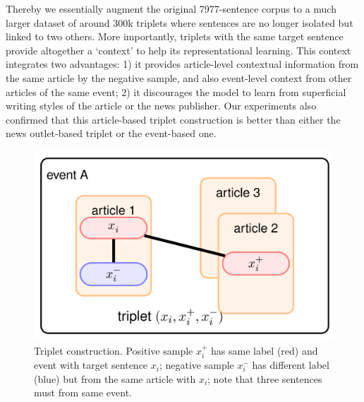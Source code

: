 Thereby we essentially augment the original 7977-sentence corpus to a much larger dataset of around 300k triplets where sentences are no longer isolated but linked to two others. More importantly, triplets with the same target sentence provide altogether a `context' to help its representational learning. This context integrates two advantages: 1) it provides article-level contextual information from the same article by the negative sample, and also event-level context from other articles of the same event; 2) it discourages the model to learn from superficial writing styles of the article or the news publisher. Our experiments also confirmed that this article-based triplet construction is better than either the news outlet-based triplet or the event-based one.






\begin{figure}[!htbp]\centering
    \includegraphics[width=.7\linewidth]{img/triplet.PNG}
      \caption{Triplet construction. Positive sample $x_i^+$ has same label (red) and event with target sentence $x_i$; negative sample $x_i^-$ has different label (blue) but from the same article with $x_i$; note that three sentences must from same event.}
  \label{fig:triplet}
\end{figure}

